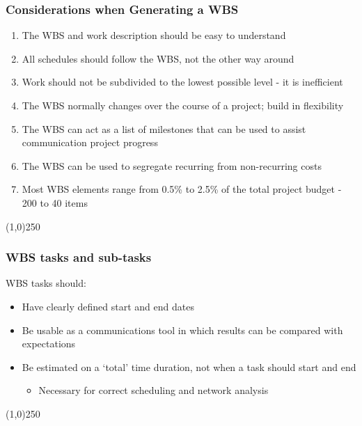 \begin{frame}
\frametitle{Considerations when Generating a WBS}
\begin{enumerate}
	\item The WBS and work description should be easy to understand
	\item All schedules should follow the WBS, not the other way around
	\item Work should not be subdivided to the lowest possible level - it is inefficient
	\item The WBS normally changes over the course of a project; build in flexibility
	\item The WBS can act as a list of milestones that can be used to assist communication project progress
	\item The WBS can be used to segregate recurring from non-recurring costs
	\item Most WBS elements range from 0.5\% to 2.5\% of the total project budget - 200 to 40 items
\end{enumerate}
\end{frame}\begin{center}\line(1,0){250}\end{center}



\begin{frame}
\frametitle{WBS tasks and sub-tasks}
WBS tasks should:
\begin{itemize}
	\item Have clearly defined start and end dates
	\item Be usable as a communications tool in which results can be compared with expectations
	\item Be estimated on a `total' time duration, not when a task should start and end 
		\begin{itemize}
			\item Necessary for correct scheduling and network analysis
		\end{itemize}
\end{itemize}
\end{frame}\begin{center}\line(1,0){250}\end{center}



